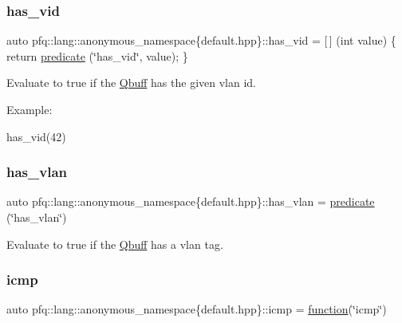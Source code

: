 \subsubsection{\texorpdfstring{has\+\_\+vid}{has\_vid}}
{\footnotesize\ttfamily auto pfq\+::lang\+::anonymous\+\_\+namespace\{default.\+hpp\}\+::has\+\_\+vid = \mbox{[}$\,$\mbox{]} (int value) \{ return \hyperlink{namespacepfq_1_1lang_aca9adafc436b7f851621b979fa1aaf88}{predicate} (\char`\"{}has\+\_\+vid\char`\"{}, value); \}}



Evaluate to {\ttfamily true} if the \hyperlink{structpfq_1_1lang_1_1Qbuff}{Qbuff} has the given vlan id. 

Example\+:

has\+\_\+vid(42) \mbox{\label{namespacepfq_1_1lang_1_1anonymous__namespace_02default_8hpp_03_a1f0378ddfa90777d11ffae5fbb57b4e0}} 
\subsubsection{\texorpdfstring{has\+\_\+vlan}{has\_vlan}}
{\footnotesize\ttfamily auto pfq\+::lang\+::anonymous\+\_\+namespace\{default.\+hpp\}\+::has\+\_\+vlan = \hyperlink{namespacepfq_1_1lang_aca9adafc436b7f851621b979fa1aaf88}{predicate} (\char`\"{}has\+\_\+vlan\char`\"{})}



Evaluate to {\ttfamily true} if the \hyperlink{structpfq_1_1lang_1_1Qbuff}{Qbuff} has a vlan tag. 

\mbox{\label{namespacepfq_1_1lang_1_1anonymous__namespace_02default_8hpp_03_a3becf93771a800904f002e39b1cc388f}} 
\subsubsection{\texorpdfstring{icmp}{icmp}}
{\footnotesize\ttfamily auto pfq\+::lang\+::anonymous\+\_\+namespace\{default.\+hpp\}\+::icmp = \hyperlink{namespacepfq_1_1lang_a1a4638059d700ae08d0ca63886ff2bb3}{function}(\char`\"{}icmp\char`\"{})}



